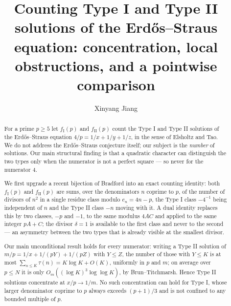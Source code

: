 \documentclass[11pt,reqno]{amsart}
\theoremstyle{plain}
\theoremstyle{definition}
\numberwithin{equation}{section}
\newcommand{\fI}{f_{\mathrm{I}}}
\newcommand{\fII}{f_{\mathrm{II}}}
\begin{document}
\title[Counting Type I and Type II Erd\H{o}s--Straus solutions]
{Counting Type I and Type II solutions of the Erd\H{o}s--Straus equation:
concentration, local obstructions, and a pointwise comparison}

\author{Xinyang Jiang}


\begin{abstract}
For a prime $p\ge5$ let $\fI(p)$ and $\fII(p)$ count the Type I and Type II solutions
of the Erd\H{o}s--Straus equation $4/p=1/x+1/y+1/z$, in the sense of Elsholtz and Tao.
We do not address the Erd\H{o}s--Straus conjecture itself; our subject is the
\emph{number} of solutions. Our main structural finding is that a quadratic character
can distinguish the two types only when the numerator is not a perfect square --- so
never for the numerator $4$.

We first upgrade a recent bijection of Bradford into an exact counting identity: both
$\fI(p)$ and $\fII(p)$ are sums, over the denominators $n$ coprime to $p$, of the
number of divisors of $n^{2}$ in a single residue class modulo $e_{n}=4n-p$, the
Type I class $-4^{-1}$ being independent of $n$ and the Type II class $-n$ moving with
it. A dual identity replaces this by two classes, $-p$ and $-1$, to the same modulus
$4AC$ and applied to the same integer $pA+C$; the divisor $\delta=1$ is available to
the first class and never to the second --- an asymmetry between the two types that is
already visible at the smallest divisor.

Our main unconditional result holds for every numerator: writing a Type II solution of
$m/p=1/x+1/(pY)+1/(pZ)$ with $Y\le Z$, the number of those with $Y\le K$ is at most
$\sum_{n\le K}\tau(n)=K\log K+O(K)$, uniformly in $p$ and $m$; on average over $p\le N$
it is only $O_{m}((\log K)^{3}\log\log K)$, by Brun--Titchmarsh. Hence Type II
solutions concentrate at $x/p\to1/m$. No such concentration can hold for Type I, whose
larger denominator coprime to $p$ always exceeds $(p+1)/3$ and is not confined to any
bounded multiple of $p$.


\end{abstract}
\end{document}
